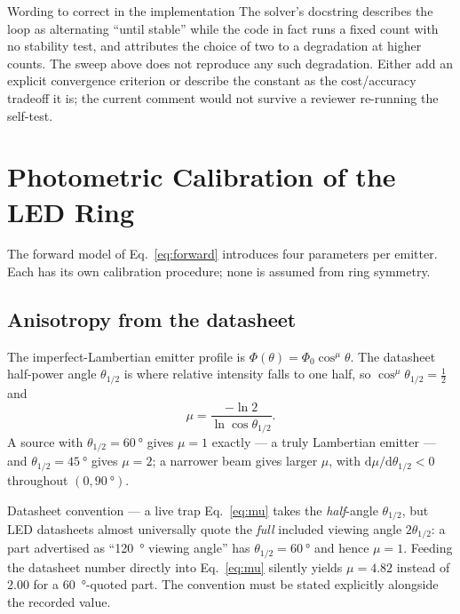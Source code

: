 \documentclass[journal,10pt]{IEEEtran}
\begin{document}
\begin{notebox}{Wording to correct in the implementation}
The solver's docstring describes the loop as alternating ``until stable'' while
the code in fact runs a fixed count with no stability test, and attributes the
choice of two to a degradation at higher counts. The sweep above does not
reproduce any such degradation. Either add an explicit convergence criterion or
describe the constant as the cost/accuracy tradeoff it is; the current comment
would not survive a reviewer re-running the self-test.
\end{notebox}

\section{Photometric Calibration of the LED Ring}\label{sec:ledcalib}
The forward model of Eq.~\eqref{eq:forward} introduces four parameters per
emitter. Each has its own calibration procedure; none is assumed from ring
symmetry.

\subsection{Anisotropy from the datasheet}\label{sec:aniso}
The imperfect-Lambertian emitter profile is $\Phi(\theta)=\Phi_0\cos^\mu\theta$.
The datasheet half-power angle $\theta_{1/2}$ is where relative intensity falls
to one half, so $\cos^\mu\theta_{1/2} = \tfrac{1}{2}$ and
\begin{equation}
\mu = \frac{-\ln 2}{\ln\cos\theta_{1/2}} .
\label{eq:mu}
\end{equation}
A source with $\theta_{1/2}=\SI{60}{\degree}$ gives $\mu=1$ exactly --- a truly
Lambertian emitter --- and $\theta_{1/2}=\SI{45}{\degree}$ gives $\mu=2$; a
narrower beam gives larger $\mu$, with $\mathrm{d}\mu/\mathrm{d}\theta_{1/2}<0$
throughout $(0,\SI{90}{\degree})$.

\begin{notebox}{Datasheet convention --- a live trap}
Eq.~\eqref{eq:mu} takes the \emph{half}-angle $\theta_{1/2}$, but LED datasheets
almost universally quote the \emph{full} included viewing angle
$2\theta_{1/2}$: a part advertised as ``\SI{120}{\degree} viewing angle'' has
$\theta_{1/2}=\SI{60}{\degree}$ and hence $\mu=1$. Feeding the datasheet number
directly into Eq.~\eqref{eq:mu} silently yields $\mu=4.82$ instead of \num{2.00}
for a \SI{60}{\degree}-quoted part. The convention must be stated explicitly
alongside the recorded value.
\end{notebox}
\end{document}
